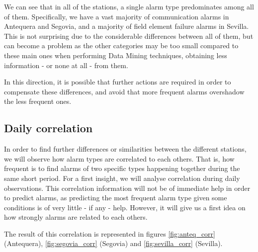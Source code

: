 \documentclass[a4paper,12pt]{article}
\begin{document}
\clearpage

We can see that in all of the stations, a single alarm type predominates among all of them. Specifically, we have a vast majority of communication alarms in Antequera and Segovia, and a majority of field element failure alarms in Sevilla. This is not surprising due to the considerable differences between all of them, but can become a problem as the other categories may be too small compared to these main ones when performing Data Mining techniques, obtaining less information - or none at all - from them.

In this direction, it is possible that further actions are required in order to compensate these differences, and avoid that more frequent alarms overshadow the less frequent ones.

\subsection{Daily correlation}
In order to find further differences or similarities between the different stations, we will observe how alarm types are correlated to each others. That is, how frequent is to find alarms of two specific types happening together during the same short period. For a first insight, we will analyse correlation during daily observations. This correlation information will not be of immediate help in order to predict alarms, as predicting the most frequent alarm type given some conditions is of very little - if any - help. However, it will give us a first idea on how strongly alarms are related to each others.

The result of this correlation is represented in figures \ref{fig:anteq_corr} (Antequera), \ref{fig:segovia_corr} (Segovia) and \ref{fig:sevilla_corr} (Sevilla).
\end{document}
